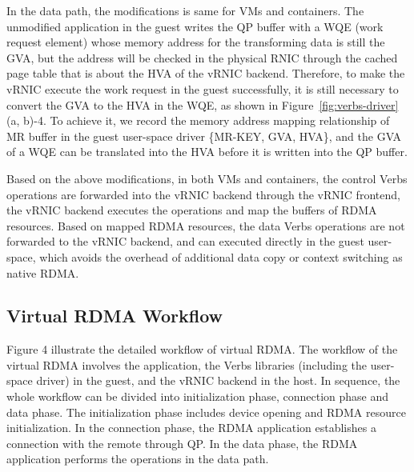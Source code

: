 In the data path, the modifications is same for VMs and containers. The unmodified application in the guest writes the QP buffer with a WQE (work request element) whose memory address for the transforming data is still the GVA, but the address will be checked in the physical RNIC through the cached page table that is about the HVA of the vRNIC backend. Therefore, to make the vRNIC execute the work request in the guest successfully, it is still necessary to convert the GVA to the HVA in the WQE, as shown in Figure~\ref{fig:verbs-driver} (a, b)-4. To achieve it, we record the memory address mapping relationship of MR buffer in the guest user-space driver \{MR-KEY, GVA, HVA\}, and the GVA of a WQE can be translated into the HVA before it is written into the QP buffer.

Based on the above modifications, in both VMs and containers, the control Verbs operations are forwarded into the vRNIC backend through the vRNIC frontend, the vRNIC backend executes the operations and map the buffers of RDMA resources. Based on mapped RDMA resources, the data Verbs operations are not forwarded to the vRNIC backend, and can executed directly in the guest user-space, which avoids the overhead of additional data copy or context switching as native RDMA.

\subsection{Virtual RDMA Workflow}
Figure 4 illustrate the detailed workflow of virtual RDMA. The workflow of the virtual RDMA involves the application, the Verbs libraries (including the user-space driver) in the guest, and the vRNIC backend in the host. In sequence, the whole workflow can be divided into initialization phase, connection phase and data phase. The initialization phase includes device opening and RDMA resource initialization. In the connection phase, the RDMA application establishes a connection with the remote through QP. In the data phase, the RDMA application performs the operations in the data path.

